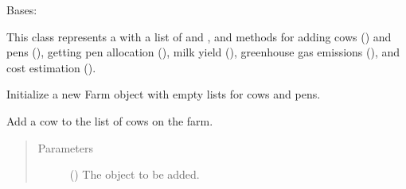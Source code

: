 \documentclass[letterpaper,10pt,english]{sphinxmanual}
\begin{document}
\begin{fulllineitems}
\label{\detokenize{farming:farming.farm1.Farm}}
\sphinxAtStartPar
Bases: 

\sphinxAtStartPar
This class represents a  with a list of {\hyperref[\detokenize{farming:farming.farm1.Farm.cows}]{}} and {\hyperref[\detokenize{farming:farming.farm1.Farm.pens}]{}}, and methods for
adding cows ({\hyperref[\detokenize{farming:farming.farm1.Farm.add_cow}]{}}) and pens ({\hyperref[\detokenize{farming:farming.farm1.Farm.add_pen}]{}}),
getting pen allocation ({\hyperref[\detokenize{farming:farming.farm1.Farm.get_pen_allocation}]{}}), milk yield ({\hyperref[\detokenize{farming:farming.farm1.Farm.get_milk_yield}]{}}), greenhouse gas emissions ({\hyperref[\detokenize{farming:farming.farm1.Farm.get_ghg_emissions}]{}}), 
and cost estimation ({\hyperref[\detokenize{farming:farming.farm1.Farm.get_cost_estimation}]{}}).

\sphinxAtStartPar
Initialize a new Farm object with empty lists for cows and pens.

\begin{fulllineitems}
\label{\detokenize{farming:farming.farm1.Farm.add_cow}}
\sphinxAtStartPar
Add a cow to the list of cows on the farm.
\begin{quote}\begin{description}
\item[{Parameters}] \leavevmode
\sphinxAtStartPar
{} ({\hyperref[\detokenize{farming:farming.farm1.Cow}]{}}) \textendash{} The  object to be added.


\end{description}
\end{quote}
\end{fulllineitems}
\end{fulllineitems}
\end{document}

